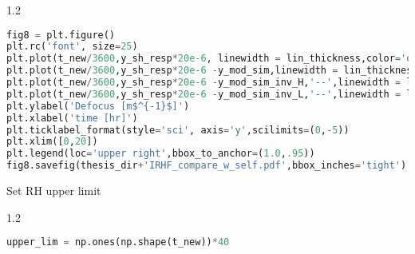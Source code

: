 
\begin{spacing}{1.2} \begin{lstlisting}[frame=single,language=Python]
fig8 = plt.figure()
plt.rc('font', size=25)
plt.plot(t_new/3600,y_sh_resp*20e-6, linewidth = lin_thickness,color='orange',label ='self heating with no RH')
plt.plot(t_new/3600,y_sh_resp*20e-6 -y_mod_sim,linewidth = lin_thickness,label='self heating + RH unfiltered input',color='purple')
plt.plot(t_new/3600,y_sh_resp*20e-6 -y_mod_sim_inv_H,'--',linewidth = lin_thickness,label='self heating + RH filtered input (H$^{-1}$(s)*G$_{1}$(s))',color='red')
plt.plot(t_new/3600,y_sh_resp*20e-6 -y_mod_sim_inv_L,'--',linewidth = lin_thickness,label='self heating + RH filtered input (H$^{-1}$(s)*G$_{2}$(s))',color='green')
plt.ylabel('Defocus [m$^{-1}$]')
plt.xlabel('time [hr]')
plt.ticklabel_format(style='sci', axis='y',scilimits=(0,-5))
plt.xlim([0,20])
plt.legend(loc='upper right',bbox_to_anchor=(1.0,.95))
fig8.savefig(thesis_dir+'IRHF_compare_w_self.pdf',bbox_inches='tight')
\end{lstlisting} \end{spacing}


\noindent Set RH upper limit

\begin{spacing}{1.2} \begin{lstlisting}[frame=single,language=Python]
upper_lim = np.ones(np.shape(t_new))*40
\end{lstlisting} \end{spacing}

